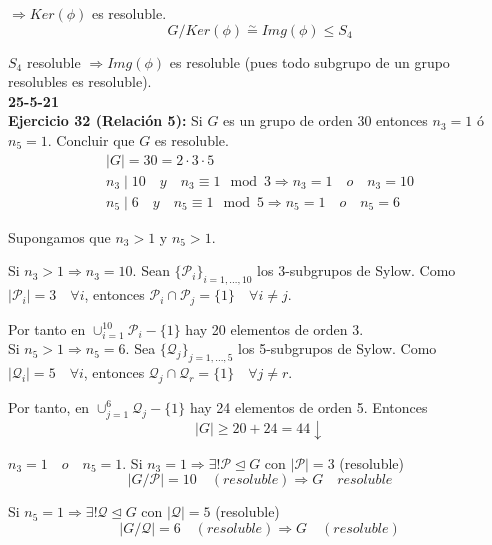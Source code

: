 \documentclass{article}
\begin{document}
$\Rightarrow Ker(\phi)$ es resoluble.
\begin{equation*}
G/Ker(\phi)\overset{\sim}{=} Img(\phi)\leq S_4
\end{equation*}

$S_4$ resoluble $\Rightarrow Img(\phi)$ es resoluble (pues todo subgrupo de un grupo resolubles es resoluble). \\

\textbf{25-5-21} \\

\textbf{Ejercicio 32 (Relación 5):} Si $G$ es un grupo de orden 30 entonces $n_3=1$ ó $n_5=1$. Concluir que $G$ es resoluble.
\begin{gather*}
|G|=30=2\cdot 3\cdot 5\\
n_3\mid 10 \quad y\quad n_3\equiv 1\mod{3}\Rightarrow n_3=1\quad o\quad n_3=10 \\
n_5\mid 6 \quad y\quad n_5\equiv 1\mod{5}\Rightarrow n_5=1\quad o\quad n_5=6
\end{gather*}

Supongamos que $n_3>1$ y $n_5>1$.

Si $n_3>1\Rightarrow n_3=10$. Sean $\{\mathcal{P}_i\}_{i=1,\ldots,10}$ los 3-subgrupos de Sylow. Como $|\mathcal{P}_i|=3\quad \forall i$, entonces $\mathcal{P}_i\cap \mathcal{P}_j=\{1\}\quad \forall i\neq j$. 

Por tanto en $\cup_{i=1}^{10}\mathcal{P}_i-\{1\}$ hay 20 elementos de orden 3. \\

Si $n_5>1\Rightarrow n_5=6$. Sea $\{\mathcal{Q}_j\}_{j=1,\ldots,5}$ los 5-subgrupos de Sylow. Como $|\mathcal{Q}_i|=5\quad \forall i$, entonces $\mathcal{Q}_j\cap \mathcal{Q}_r=\{1\}\quad \forall j\neq r$.

Por tanto, en $\cup_{j=1}^6 \mathcal{Q}_j-\{1\}$ hay 24 elementos de orden 5. Entonces 
\begin{equation*}
|G|\geq 20+24=44\downarrow
\end{equation*}

$n_3=1\quad o\quad n_5=1$.
Si $n_3=1\Rightarrow \exists!\mathcal{P}\unlhd G$ con $|\mathcal{P}|=3$ (resoluble)
\begin{equation*}
|G/\mathcal{P}|=10\quad (resoluble)\Rightarrow G\quad resoluble
\end{equation*}

Si $n_5=1\Rightarrow \exists! \mathcal{Q}\unlhd G$ con $|\mathcal{Q}|=5$ (resoluble)
\begin{equation*}
|G/\mathcal{Q}|=6\quad (resoluble)\Rightarrow G\quad (resoluble)
\end{equation*}
\end{document}
